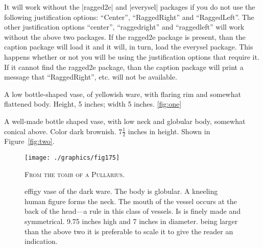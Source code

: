 It will work without the |ragged2e| and |everysel| packages if you do not use the following
justification options: \enquote{Center}, \enquote{RaggedRight} and \enquote{RaggedLeft}. The other justification
options \enquote{center}, \enquote{raggedright} and \enquote{raggedleft} will work without the above two packages. If the ragged2e package is present, than the caption package will load it and it
will, in turn, load the everysel package. This happens whether or not you will be using
the justification options that require it. If it cannot find the ragged2e package, than the
caption package will print a message that \enquote{RaggedRight}, etc. will not be available.




 A low bottle-shaped vase, of yellowish ware, with flaring rim and somewhat flattened body. Height, 5 inches; width 5 inches. \ref{fig:one}

A well-made bottle shaped vase, with low neck and globular body, somewhat conical above. Color dark brownish. $7\frac{1}{2}$ inches in height. Shown in Figure~\ref{fig:two}.


\begin{figure}[htp]
  \centering
  \texttt{[image: ./graphics/fig175]}
  \vspace{3\baselineskip}

   \centerline{\textsc{From the tomb of a Pull\= arius.}}
  \label{fig:marginfig1}
  \caption{ effigy vase of the dark ware. The body is globular. A kneeling human figure forms the neck. The mouth of the vessel occurs at the back of the head—a rule in this class of vessels. Is is finely made and symmetrical. 9.75 inches high and 7 inches in diameter. being larger than the above two it is preferable to scale it to give the reader an indication.}
\end{figure}

